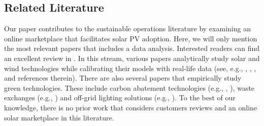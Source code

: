 \documentclass[msom,blindrev]{informs3}
\begin{document}
	
\subsection{Related Literature} \label{Sec: Lit}
	
	Our paper contributes to the sustainable operations literature by examining an online marketplace that facilitates solar PV adoption. Here, we will only mention the most relevant papers that includes a data analysis. Interested readers can find an excellent review in \cite{HLee}. In this stream, various papers analytically study solar and wind technologies while calibrating their models with real-life data (see, e.g., \cite{alanwolf}, \cite{NJ}, \cite{SunarandBirge}, and references therein). There are also several papers that empirically study green technologies. These include carbon abatement technologies (e.g., \cite{blanco2020carbon}, \cite{Corbett2}), waste exchanges (e.g., \cite{Suvrat}) and  off-grid lighting solutions (e.g., \cite{uppari}).
	To the best of our knowledge, there is no prior work that considers customers reviews and an online solar marketplace in this literature.
	
	
	
	
\end{document}
